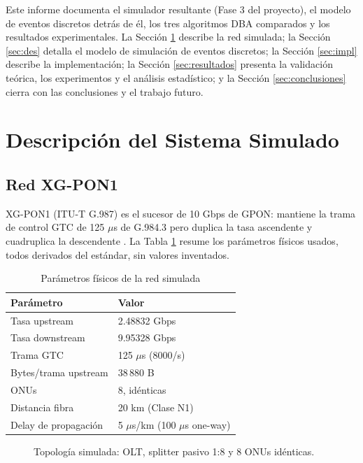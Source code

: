 \documentclass[conference]{IEEEtran}
\begin{document}
Este informe documenta el simulador resultante (Fase 3 del proyecto), el
modelo de eventos discretos detrás de él, los tres algoritmos DBA
comparados y los resultados experimentales. La Sección \ref{sec:sistema}
describe la red simulada; la Sección \ref{sec:des} detalla el modelo de
simulación de eventos discretos; la Sección \ref{sec:impl} describe la
implementación; la Sección \ref{sec:resultados} presenta la validación
teórica, los experimentos y el análisis estadístico; y la
Sección \ref{sec:conclusiones} cierra con las conclusiones y el trabajo
futuro.

\section{Descripción del Sistema Simulado}
\label{sec:sistema}

\subsection{Red XG-PON1}

XG-PON1 (ITU-T G.987) es el sucesor de 10 Gbps de GPON: mantiene la trama
de control GTC de 125 $\mu$s de G.984.3 \cite{itu984-3} pero duplica la
tasa ascendente y cuadruplica la descendente \cite{itu987-1,itu987-2,itu987-3}. La Tabla
\ref{tab:fisicos} resume los parámetros físicos usados, todos derivados
del estándar, sin valores inventados.

\begin{table}[h]
\centering
\caption{Parámetros físicos de la red simulada}
\label{tab:fisicos}
\begin{tabular}{ll}
\toprule
Parámetro & Valor \\
\midrule
Tasa upstream & 2.48832 Gbps \\
Tasa downstream & 9.95328 Gbps \\
Trama GTC & 125 $\mu$s (8000/s) \\
Bytes/trama upstream & 38\,880 B \\
ONUs & 8, idénticas \\
Distancia fibra & 20 km (Clase N1) \\
Delay de propagación & 5 $\mu$s/km (100 $\mu$s one-way) \\
\bottomrule
\end{tabular}
\end{table}

\begin{figure}[h]
\centering
{}
\caption{Topología simulada: OLT, splitter pasivo 1:8 y 8 ONUs idénticas.}
\label{fig:topologia}
\end{figure}
\end{document}
